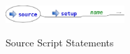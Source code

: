 \begin{figure}[htp]
\centering
\includegraphics[width=0.4\textwidth]{source_service_script}
\label{fig:source_service_script}
\caption{Source Script Statements}
\end{figure}
